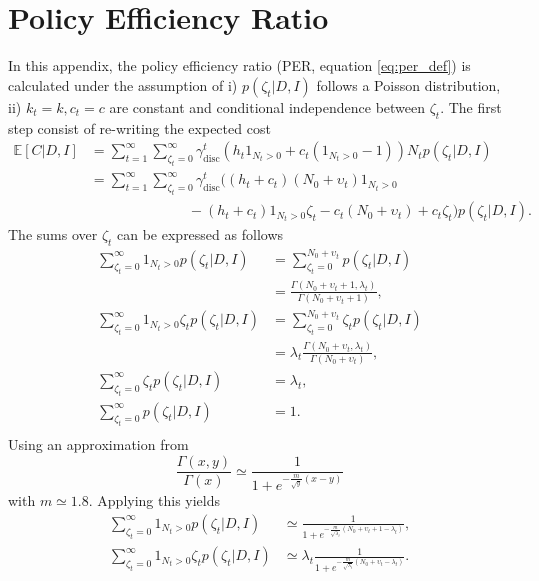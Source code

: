 \section{Policy Efficiency Ratio}
\label{app:cer}
In this appendix, the policy efficiency ratio (PER, equation \eqref{eq:per_def}) is calculated under the assumption of i) $p(\zeta_t|D,I)$ follows a Poisson distribution, ii) $k_t=k,c_t=c$ are constant and conditional independence between $\zeta_t$. The first step consist of re-writing the expected cost
\begin{equation}
	\begin{split}
		\mathbb{E}[C|D,I] &= \sum_{t=1}^{\infty}\sum_{\zeta_t=0}^\infty \gamma_{\text{disc}}^{t} \left( h_t 1_{N_t> 0} + c_t (1_{N_t> 0}-1) \right)N_tp(\zeta_t| D, I)\\
		&= \sum_{t=1}^{\infty}\sum_{\zeta_t=0}^\infty \gamma_{\text{disc}}^{t} \bigg( 
		(h_t+c_t)(N_0 + \upsilon_t)1_{N_t> 0}\\
		&\qquad\qquad\qquad\quad-(h_t+c_t) 1_{N_t> 0}\zeta_t
		- c_t(N_0 + \upsilon_t)+c_t\zeta_t\bigg)p(\zeta_t| D, I).
	\end{split}
\end{equation}
The sums over $\zeta_t$ can be expressed as follows
\begin{equation}
	\begin{split}
		\sum_{\zeta_t=0}^\infty1_{N_t> 0}p(\zeta_t| D, I) & = \sum_{\zeta_t=0}^{N_0+\upsilon_t} p(\zeta_t| D, I)\\
		&= \frac{\Gamma(N_0+\upsilon_t+1,\lambda_t)}{\Gamma(N_0+\upsilon_t+1)},\\
		\sum_{\zeta_t=0}^\infty1_{N_t> 0}\zeta_tp(\zeta_t| D, I) & = \sum_{\zeta_t=0}^{N_0+\upsilon_t} \zeta_t p(\zeta_t| D, I)\\
		& = \lambda_t \frac{\Gamma(N_0+\upsilon_t,\lambda_t)}{\Gamma(N_0+\upsilon_t)},\\
		\sum_{\zeta_t=0}^\infty\zeta_tp(\zeta_t| D, I) & = \lambda_t,\\
		\sum_{\zeta_t=0}^\infty p(\zeta_t| D, I) & = 1.\\
	\end{split}
\end{equation}
Using an approximation from \cite{bartmann1992inventory}
\begin{equation}
	\frac{\Gamma(x,y)}{\Gamma(x)}\simeq \frac{1}{1+e^{-\frac{m}{\sqrt{y}}(x-y)}}
\end{equation}
with $m\simeq 1.8$. Applying this yields
\begin{equation}
	\begin{split}
		\sum_{\zeta_t=0}^\infty1_{N_t> 0}p(\zeta_t| D, I) & \simeq \frac{1}{1+e^{-\frac{m}{\sqrt{\lambda_t}}(N_0+\upsilon_t+1-\lambda_t)}},\\
		\sum_{\zeta_t=0}^\infty1_{N_t> 0}\zeta_tp(\zeta_t| D, I) & \simeq \lambda_t\frac{1}{1+e^{-\frac{m}{\sqrt{\lambda_t}}(N_0+\upsilon_t-\lambda_t)}}.
	\end{split}
\end{equation}
